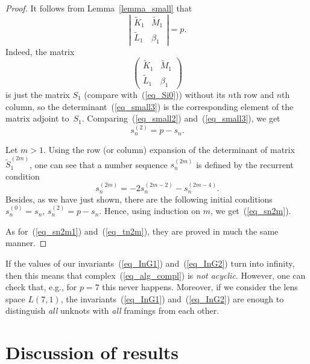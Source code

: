 \documentclass[pdftex]{sigma}
\begin{document}
\begin{proof}
It follows from Lemma~\ref{lemma_small} that
\begin{equation}
\left| \begin{array}{cc} \widetilde K_1 & \widetilde M_1 \\ \widetilde L_1 & \beta_1 \end{array} \right| = p.
\label{eq_small3}
\end{equation}
Indeed, the matrix
\begin{displaymath}
\left( \begin{array}{cc} \widetilde K_1 & \widetilde M_1 \\ \widetilde L_1 & \beta_1 \end{array} \right)
\end{displaymath}
is just the matrix $S_1$ (compare with~(\ref{eq_Si0})) without its $n$th row and $n$th column, so the determinant~(\ref{eq_small3}) is the corresponding element of the matrix adjoint to~$S_1$. Comparing~(\ref{eq_small2}) and~(\ref{eq_small3}), we get
\begin{displaymath}
s_n^{(2)} = p - s_n.
\end{displaymath}

Let $m > 1$. Using the row (or column) expansion of the determinant of matrix $\widetilde S_1^{(2m)}$, one can see that a number sequence $s_n^{(2m)}$ is def\/ined by the recurrent condition
\begin{equation*}
s_n^{(2m)} = -2 s_n^{(2m-2)} - s_n^{(2m-4)}.
\end{equation*}
Besides, as we have just shown, there are the following initial conditions $s_n^{(0)} = s_n$, $s_n^{(2)} = p - s_n$. Hence, using induction on $m$, we get~(\ref{eq_sn2m}).

As for~(\ref{eq_sn2m1}) and~(\ref{eq_tn2m}), they are proved in much the same manner.
\end{proof}

\begin{remark}
\label{remark_L71}
If the values of our invariants~(\ref{eq_InG1}) and~(\ref{eq_InG2}) turn into inf\/inity, then this means that complex~(\ref{eq_alg_compl}) is \emph{not acyclic}. However, one can check that, e.g., for $p = 7$ this never happens. Moreover, if we consider the lens space $L(7,1)$, the invariants~(\ref{eq_InG1}) and~(\ref{eq_InG2}) are enough to distinguish \emph{all} unknots with \emph{all} framings from each other.
\end{remark}


\section{Discussion of results}
\label{sec_discussion}
\end{document}
